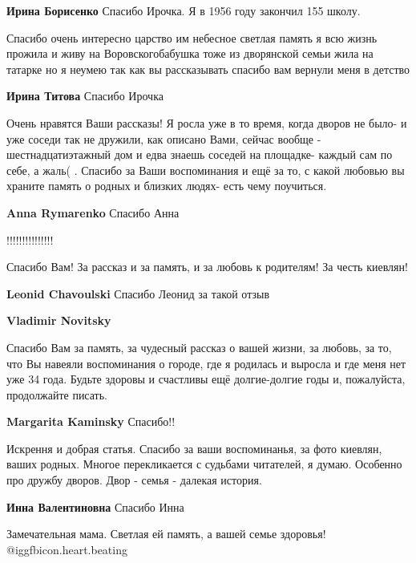 \begin{itemize}
\textbf{Ирина Борисенко} Спасибо Ирочка. Я в 1956 году закончил 155 школу.


Спасибо очень интересно царство им небесное светлая память я всю жизнь прожила
и живу на Воровскогобабушка тоже из дворянской семьи жила на татарке но я
неумею так как вы рассказывать спасибо вам вернули меня в детство

\textbf{Ирина Титова} Спасибо Ирочка


Очень нравятся Ваши рассказы! Я росла уже в то время, когда дворов не было- и
уже соседи так не дружили, как описано Вами, сейчас вообще - шестнадцатиэтажный
дом и едва знаешь соседей на площадке- каждый сам по себе, а жаль( . Спасибо за
Ваши воспоминания и ещё за то, с какой любовью вы храните память о родных и
близких людях- есть чему поучиться.

\textbf{Anna Rymarenko} Спасибо Анна

!!!!!!!!!!!!!!!


Спасибо Вам! За рассказ и за память, и за любовь к родителям! За честь киевлян!

\begin{itemize} %
\textbf{Leonid Chavoulski} Спасибо Леонид за такой отзыв

\textbf{Vladimir Novitsky}

Спасибо Вам за память, за чудесный рассказ о вашей жизни, за любовь, за то, что
Вы навеяли воспоминания о городе, где я родилась и выросла и где меня нет уже
34 года. Будьте здоровы и счастливы ещё долгие-долгие годы и, пожалуйста,
продолжайте писать.

\textbf{Margarita Kaminsky} Спасибо!!
\end{itemize} %


Искрення и добрая статья. Спасибо за ваши воспоминанья, за фото киевлян, ваших
родных. Многое перекликается с судьбами читателей, я думаю. Особенно про
дружбу дворов. Двор - семья - далекая история.

\textbf{Инна Валентиновна} Спасибо Инна

Замечательная мама. Светлая ей память, а вашей семье здоровья! @igg{fbicon.heart.beating} 


\end{itemize}

